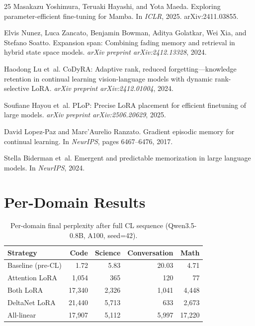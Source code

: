 \documentclass{article}
\begin{document}
\begin{thebibliography}{25}
Masakazu Yoshimura, Teruaki Hayashi, and Yota Maeda.
\newblock Exploring parameter-efficient fine-tuning for Mamba.
\newblock In \emph{ICLR}, 2025. arXiv:2411.03855.

Elvis Nunez, Luca Zancato, Benjamin Bowman, Aditya Golatkar, Wei Xia, and Stefano Soatto.
\newblock Expansion span: Combining fading memory and retrieval in hybrid state space models.
\newblock \emph{arXiv preprint arXiv:2412.13328}, 2024.

Haodong Lu et~al.
\newblock CoDyRA: Adaptive rank, reduced forgetting---knowledge retention in continual learning vision-language models with dynamic rank-selective LoRA.
\newblock \emph{arXiv preprint arXiv:2412.01004}, 2024.

Soufiane Hayou et~al.
\newblock PLoP: Precise LoRA placement for efficient finetuning of large models.
\newblock \emph{arXiv preprint arXiv:2506.20629}, 2025.

David Lopez-Paz and Marc'Aurelio Ranzato.
\newblock Gradient episodic memory for continual learning.
\newblock In \emph{NeurIPS}, pages 6467--6476, 2017.

Stella Biderman et~al.
\newblock Emergent and predictable memorization in large language models.
\newblock In \emph{NeurIPS}, 2024.

\end{thebibliography}

\appendix
\section{Per-Domain Results}

\begin{table}[h]
\centering
\caption{Per-domain final perplexity after full CL sequence (Qwen3.5-0.8B, A100, seed=42).}
\label{tab:perdomain}
\begin{tabular}{lrrrr}
\toprule
\textbf{Strategy} & \textbf{Code} & \textbf{Science} & \textbf{Conversation} & \textbf{Math} \\
\midrule
Baseline (pre-CL) & 1.72 & 5.83 & 20.03 & 4.71 \\
Attention LoRA & 1,054 & 365 & 120 & 77 \\
Both LoRA & 17,340 & 2,326 & 1,041 & 4,448 \\
DeltaNet LoRA & 21,440 & 5,713 & 633 & 2,673 \\
All-linear & 17,907 & 5,112 & 5,997 & 17,220 \\
\bottomrule
\end{tabular}
\end{table}
\end{document}
